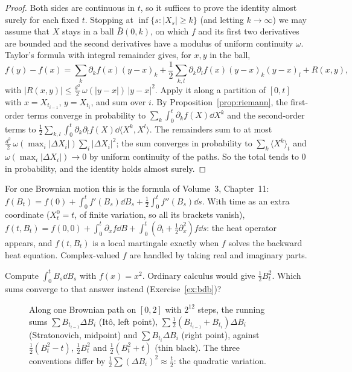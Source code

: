 \begin{proof}
Both sides are continuous in $t$, so it suffices to prove the identity almost surely for each fixed $t$. Stopping at $\inf\{s:|X_s|\ge k\}$ (and letting $k\to\infty$) we may assume that $X$ stays in a ball $\bar B(0,k)$, on
which $f$ and its first two derivatives are bounded and the second derivatives have a modulus of uniform continuity $\omega$. Taylor's formula with integral remainder gives, for $x,y$ in the ball,
\[
f(y)-f(x)=\sum_k\partial_kf(x)(y-x)_k+\frac12\sum_{k,l}\partial_k\partial_lf(x)(y-x)_k(y-x)_l+R(x,y),
\]
with $|R(x,y)|\le\frac{d^2}2\,\omega(|y-x|)\,|y-x|^2$.
Apply it along a partition of $[0,t]$ with $x=X_{t_{i-1}}$, $y=X_{t_i}$, and sum over $i$. By Proposition~\ref{prop:riemann}, the first-order terms converge in probability to $\sum_k\int_0^t\partial_kf(X)\dd X^k$ and the
second-order terms to $\frac12\sum_{k,l}\int_0^t\partial_k\partial_lf(X)\dd\langle X^k,X^l\rangle$. The remainders sum to at most $\frac{d^2}2\,\omega(\max_i|\Delta X_i|)\sum_i|\Delta X_i|^2$; the sum converges in probability to
$\sum_k\langle X^k\rangle_t$ and $\omega(\max_i|\Delta X_i|)\to0$ by uniform continuity of the paths. So the total tends to $0$ in probability, and the identity holds almost surely.
\end{proof}

For one Brownian motion this is the formula of Volume~3, Chapter~11: $f(B_t)=f(0)+\int_0^tf'(B_s)\dd B_s+\frac12\int_0^tf''(B_s)\dd s$. With time as an extra coordinate ($X^0_t=t$, of finite variation, so all its
brackets vanish), $f(t,B_t)=f(0,0)+\int_0^t\partial_xf\dd B+\int_0^t(\partial_t+\frac12\partial_x^2)f\dd s$: the heat operator appears, and $f(t,B_t)$ is a local martingale exactly when $f$ solves the backward heat equation.
Complex-valued $f$ are handled by taking real and imaginary parts.

\begin{think}
Compute $\int_0^tB_s\dd B_s$ with $f(x)=x^2$. Ordinary calculus would give $\frac12B_t^2$. Which sums converge to that answer instead (Exercise~\ref{ex:bdb})?
\end{think}

\begin{figure}[ht]
\centering
{}
\caption{Along one Brownian path on $[0,2]$ with $2^{12}$ steps, the running sums $\sum B_{t_{i-1}}\Delta B_i$ (It\^o, left point), $\sum\frac12(B_{t_{i-1}}+B_{t_i})\Delta B_i$ (Stratonovich, midpoint) and $\sum B_{t_i}\Delta B_i$
(right point), against $\frac12(B_t^2-t)$, $\frac12B_t^2$ and $\frac12(B_t^2+t)$ (thin black). The three conventions differ by $\frac12\sum(\Delta B_i)^2\approx\frac t2$: the quadratic variation.}
\label{fig:sums}
\end{figure}

